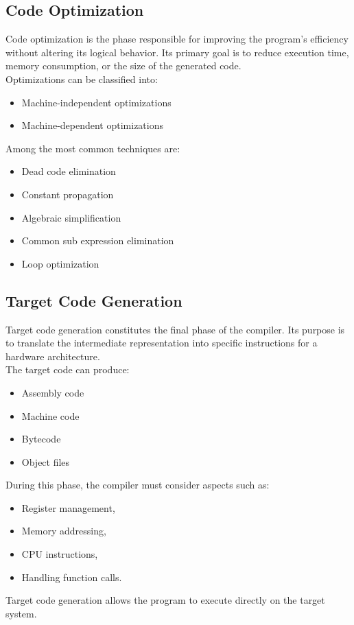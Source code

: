 \documentclass[letterpaper,12pt,oneside]{article}
\begin{document}
    \subsection{Code Optimization}
    Code optimization is the phase responsible for improving the program's efficiency without altering its logical behavior. Its primary goal is to reduce execution time, memory consumption, or the size of the generated code. \\
    Optimizations can be classified into:
    \begin{itemize}
        \item Machine-independent optimizations
        \item Machine-dependent optimizations
    \end{itemize}
    Among the most common techniques are:
    \begin{itemize}
        \item Dead code elimination
        \item Constant propagation
        \item Algebraic simplification
        \item Common sub expression elimination
        \item Loop optimization
    \end{itemize}

    \subsection{Target Code Generation}
    Target code generation constitutes the final phase of the compiler. Its purpose is to translate the intermediate representation into specific instructions for a hardware architecture. \\
    The target code can produce:
    \begin{itemize}
        \item Assembly code
        \item Machine code
        \item Bytecode
        \item Object files
    \end{itemize}
    During this phase, the compiler must consider aspects such as:
    \begin{itemize}
        \item Register management,
        \item Memory addressing,
        \item CPU instructions,
        \item Handling function calls.
    \end{itemize}
    Target code generation allows the program to execute directly on the target system.
\end{document}
